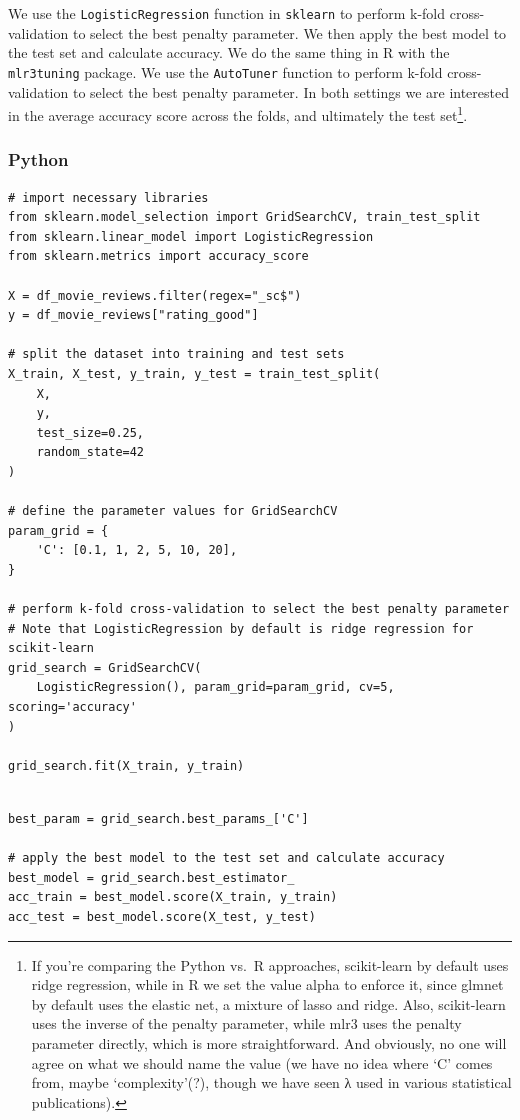 \documentclass[
  letterpaper,
]{krantz}
\begin{document}
We use the \texttt{LogisticRegression} function in \texttt{sklearn} to
perform k-fold cross-validation to select the best penalty parameter. We
then apply the best model to the test set and calculate accuracy. We do
the same thing in R with the \texttt{mlr3tuning} package. We use the
\texttt{AutoTuner} function to perform k-fold cross-validation to select
the best penalty parameter. In both settings we are interested in the
average accuracy score across the folds, and ultimately the test
set\footnote{If you're comparing the Python vs.~R approaches,
  scikit-learn by default uses ridge regression, while in R we set the
  value alpha to enforce it, since glmnet by default uses the elastic
  net, a mixture of lasso and ridge. Also, scikit-learn uses the inverse
  of the penalty parameter, while mlr3 uses the penalty parameter
  directly, which is more straightforward. And obviously, no one will
  agree on what we should name the value (we have no idea where `C'
  comes from, maybe `complexity'(?), though we have seen λ used in
  various statistical publications).}.

\subsubsection{Python}

\begin{verbatim}
# import necessary libraries
from sklearn.model_selection import GridSearchCV, train_test_split
from sklearn.linear_model import LogisticRegression
from sklearn.metrics import accuracy_score

X = df_movie_reviews.filter(regex="_sc$")
y = df_movie_reviews["rating_good"]

# split the dataset into training and test sets
X_train, X_test, y_train, y_test = train_test_split(
    X, 
    y, 
    test_size=0.25, 
    random_state=42
)

# define the parameter values for GridSearchCV
param_grid = {
    'C': [0.1, 1, 2, 5, 10, 20],
}

# perform k-fold cross-validation to select the best penalty parameter
# Note that LogisticRegression by default is ridge regression for scikit-learn
grid_search = GridSearchCV(
    LogisticRegression(), param_grid=param_grid, cv=5, scoring='accuracy'
)

grid_search.fit(X_train, y_train)
\end{verbatim}

\begin{verbatim}

best_param = grid_search.best_params_['C']

# apply the best model to the test set and calculate accuracy
best_model = grid_search.best_estimator_
acc_train = best_model.score(X_train, y_train)
acc_test = best_model.score(X_test, y_test)
\end{verbatim}
\end{document}
